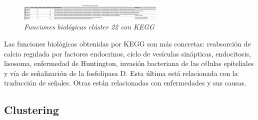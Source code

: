 \begin{figure}
	\centering
	\includegraphics[width=70mm,scale=1.2]{figures/cluster22_KEGG.png}
	\caption{\textit{Funciones biológicas clúster 22 con KEGG}}
\end{figure}

Las funciones biológicas obtenidas por KEGG son más concretas: reabsorción de calcio regulada por factores endocrinos, ciclo de vesículas sinápticas, endocitosis, lisosoma, enfermedad de Huntington, invasión bacteriana de las células epiteliales y vía de señalización de la fosfolipasa D. Esta última está relacionada con la traducción de señales. Otras están relacionadas con enfermedades y sus causas.

\subsection{Clustering}


